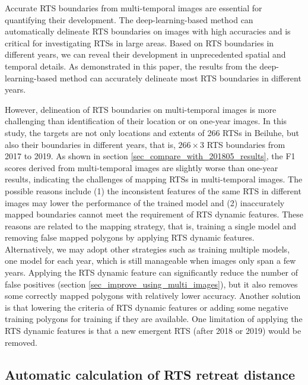 \documentclass[authoryear,preprint,review,12pt]{elsarticle}
\begin{document}
Accurate RTS boundaries from multi-temporal images are essential for quantifying their development.
The deep-learning-based method can automatically delineate RTS boundaries on images with high accuracies and is critical for investigating RTSs in large areas. 
Based on RTS boundaries in different years, we can reveal their development in unprecedented spatial and temporal details. 
As demonstrated in this paper, the results from the deep-learning-based method can accurately delineate most RTS boundaries in different years. %


However, delineation of RTS boundaries on multi-temporal images is more challenging than identification of their location or on one-year images. 
In this study, the targets are not only locations and extents of 266 RTSs in Beiluhe, but also their boundaries in different years, that is, $266\times3$ RTS boundaries from 2017 to 2019.
As shown in section \ref{sec_compare_with_201805_results}, the F1 scores derived from multi-temporal images are slightly worse than one-year results, indicating the challenges of mapping RTSs in multi-temporal images. 
The possible reasons include (1) the inconsistent features of the same RTS in different images may lower the performance of the trained model 
and (2) inaccurately mapped boundaries cannot meet the requirement of RTS dynamic features. 
These reasons are related to the mapping strategy, that is, training a single model and removing false mapped polygons by applying RTS dynamic features.  
Alternatively, we may adopt other strategies such as training multiple models, one model for each year,  which is still manageable when images only span a few years.
Applying the RTS dynamic feature can significantly reduce the number of false positives (section \ref{sec_improve_using_multi_images}), but it also removes some correctly mapped polygons with relatively lower accuracy. 
Another solution is that lowering the criteria of RTS dynamic features or adding some negative training polygons for training if they are available.
One limitation of applying the RTS dynamic features is that a new emergent RTS (after 2018 or 2019) would be removed. 



\subsection{Automatic calculation of RTS retreat distance}
\label{sec_diss_retreat_distance}
\end{document}
